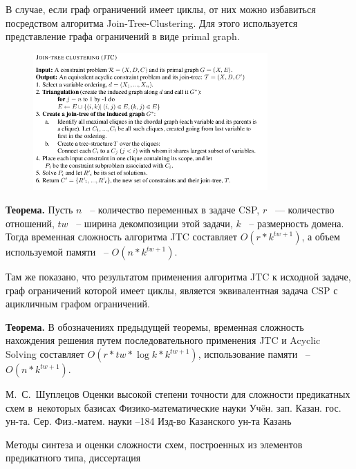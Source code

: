 \documentclass[12pt]{article}
\begin{document}
В случае, если граф ограничений имеет циклы, от них можно избавиться посредством алгоритма Join-Tree-Clustering. 
Для этого используется представление графа ограничений в виде primal graph.
\begin{figure}[htb]
\centering
\includegraphics[width=0.8\textwidth]{algo_jtc.png}
\label{fig:algo_jtc}
\end{figure}

\textbf{Теорема.} Пусть $n$ ~-- количество переменных в задаче CSP, $r$ ~--- количество отношений, $tw$ ~-- 
ширина декомпозиции этой задачи, $k$ ~-- размерность домена. 
Тогда временная сложность алгоритма JTC составляет $O(r*k^{tw+1})$, а объем используемой памяти ~-- $O(n*k^{tw+1})$.\cite{CSP10}

Там же показано, что результатом применения алгоритма JTC к исходной задаче, граф ограничений которой имеет циклы,
является эквивалентная задача CSP с ацикличным графом ограничений.

\textbf{Теорема.} В обозначениях предыдущей теоремы, временная
сложность нахождения решения путем последовательного применения JTC и Acyclic Solving составляет $O(r*tw*\log{k}*k^{tw+1})$,
использование памяти ~-- $O(n*k^{tw+1})$.\cite{CSP10}

\clearpage
{}
    \by М.~С.~Шуплецов
    \paper Оценки высокой степени точности для сложности предикатных схем в~некоторых базисах
    \inbook Физико-математические науки
    \serial Уч\"eн. зап. Казан. гос. ун-та. Сер. Физ.-матем. науки
    --184
    \publ Изд-во Казанского ун-та
    \publaddr Казань

Методы синтеза и оценки сложности схем, построенных из элементов предикатного типа, диссертация
\end{document}
